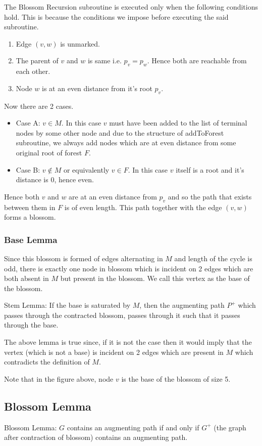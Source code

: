 \documentclass{article}
\begin{document}
The Blossom Recursion subroutine is executed only when the following conditions hold. This is because the conditions we impose before executing the said subroutine.
\begin{enumerate}
    \item Edge $(v, w)$ is unmarked.
    \item The parent of $v$ and $w$ is same i.e. $p_v = p_w$. Hence both are reachable from each other.
    \item Node $w$ is at an even distance from it's root $p_v$.
\end{enumerate}
Now there are 2 cases.
\begin{itemize}
    \item Case A: $v \in M$. 
        In this case $v$ must have been added to the list of terminal nodes by some other node and due to the structure of addToForest subroutine, we always add nodes which are at even distance from some original root of forest $F$. 
    \item Case B: $v \notin M$ or equivalently $v \in F$.
        In this case $v$ itself is a root and it's distance is 0, hence even.
\end{itemize}
Hence both $v$ and $w$ are at an even distance from $p_v$ and so the path that exists between them in $F$ is of even length. This path together with the edge $(v, w)$ forms a blossom.

\subsubsection{Base Lemma}
Since this blossom is formed of edges alternating in $M$ and length of the cycle is odd, there is exactly one node in blossom which is incident on 2 edges which are both absent in $M$ but present in the blossom. We call this vertex as the base of the blossom.

Stem Lemma: If the base is saturated by $M$, then the augmenting path $P^+$ which passes through the contracted blossom, passes through it such that it passes through the base.

The above lemma is true since, if it is not the case then it would imply that the vertex (which is not a base) is incident on 2 edges which are present in $M$ which contradicts the definition of $M$.

Note that in the figure above, node $v$ is the base of the blossom of size 5.

\subsection{Blossom Lemma}
Blossom Lemma: $G$ contains an augmenting path if and only if $G^+$ (the graph after contraction of blossom) contains an augmenting path.
\end{document}
